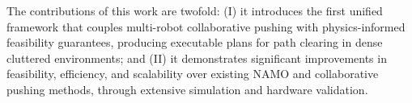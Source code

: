 The contributions of this work are twofold: {(I)} it introduces the
first unified framework that couples multi-robot collaborative pushing with
physics-informed feasibility guarantees, producing executable plans for
path clearing in dense cluttered environments; and {(II)} it
demonstrates significant improvements in feasibility, efficiency, and
scalability over existing NAMO and collaborative pushing methods, through
extensive simulation and hardware validation.
